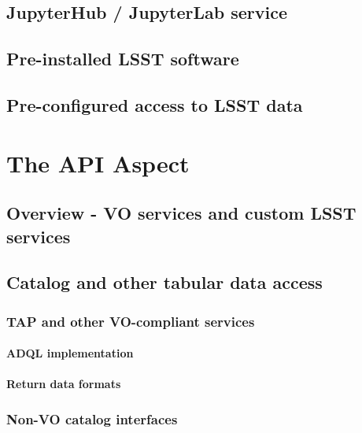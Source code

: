 \documentclass[DM,lsstdraft,toc]{lsstdoc}
\begin{document}
\subsection{JupyterHub / JupyterLab service}\label{jupyterhub-jupyterlab-service}

\subsection{Pre-installed LSST software}\label{pre-installed-lsst-software}

\subsection{Pre-configured access to LSST data}\label{pre-configured-access-to-lsst-data}

\section{The API Aspect}\label{api-aspect}

\subsection{Overview - VO services and custom LSST services}\label{api-overview}

\subsection{Catalog and other tabular data access}\label{catalog-and-other-tabular-data-access}

\subsubsection{TAP and other VO-compliant services}\label{tap-and-other-vo-compliant-services}

\paragraph{ADQL implementation}\label{adql-implementation}

\paragraph{Return data formats}\label{return-data-formats}

\subsubsection{Non-VO catalog interfaces}\label{non-vo-catalog-interfaces}
\end{document}
